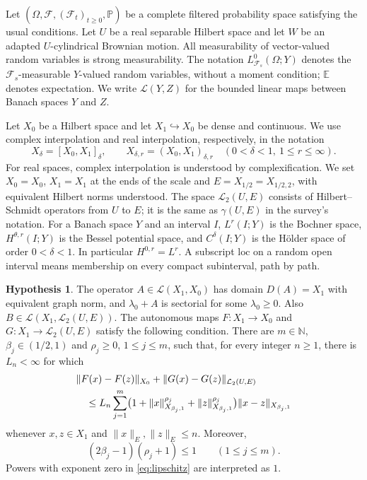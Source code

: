 \documentclass[11pt]{amsart}
\theoremstyle{definition}
\newtheorem{hypothesis}[theorem]{Hypothesis}
\theoremstyle{remark}
\newcommand{\E}{\mathbb E}
\newcommand{\Prob}{\mathbb P}
\newcommand{\N}{\mathbb N}
\newcommand{\loc}{\mathrm{loc}}
\newcommand{\HS}{\mathcal L_2(U,E)}
\newcommand{\norm}[2][]{\lVert #2\rVert_{#1}}
\numberwithin{equation}{section}
\begin{document}
Let $(\Omega,\mathcal F,(\mathcal F_t)_{t\ge0},\Prob)$ be a complete
filtered probability space satisfying the usual conditions. Let $U$ be a
real separable Hilbert space and let $W$ be an adapted $U$-cylindrical
Brownian motion. All measurability of vector-valued random variables is
strong measurability. The notation $L^0_{\mathcal F_s}(\Omega;Y)$ denotes
the $\mathcal F_s$-measurable $Y$-valued random variables, without a moment
condition; $\E$ denotes expectation. We write $\mathcal L(Y,Z)$ for the
bounded linear maps between Banach spaces $Y$ and $Z$.

Let $X_0$ be a Hilbert space and let $X_1\hookrightarrow X_0$ be dense and
continuous. We use complex interpolation and real interpolation, respectively,
in the notation
\[
 X_\delta=[X_0,X_1]_\delta,\qquad
 X_{\delta,r}=(X_0,X_1)_{\delta,r}
 \quad(0<\delta<1,\ 1\le r\le\infty).
\]
For real spaces, complex interpolation is understood by complexification.
We set $X_{0}=X_0$, $X_{1}=X_1$ at the ends of the scale and
$E=X_{1/2}=X_{1/2,2}$, with equivalent Hilbert norms understood.
The space $\HS$ consists of Hilbert--Schmidt operators from $U$ to $E$;
it is the same as $\gamma(U,E)$ in the survey's notation.
For a Banach space $Y$ and an interval $I$, $L^r(I;Y)$ is the Bochner
space, $H^{\theta,r}(I;Y)$ is the Bessel potential space, and
$C^\delta(I;Y)$ is the H\"older space of order $0<\delta<1$.
In particular $H^{0,r}=L^r$. A subscript $\loc$ on a random open interval
means membership on every compact subinterval, path by path.

\begin{hypothesis}\label{hyp:nonlinear}
The operator $A\in\mathcal L(X_1,X_0)$ has domain $D(A)=X_1$ with
equivalent graph norm, and $\lambda_0+A$ is sectorial for some
$\lambda_0\ge0$. Also $B\in\mathcal L(X_1,\HS)$.
The autonomous maps $F:X_1\to X_0$ and $G:X_1\to\HS$ satisfy the
following condition. There are $m\in\N$, $\beta_j\in(1/2,1)$ and
$\rho_j\ge0$, $1\le j\le m$, such that, for every integer $n\ge1$,
there is $L_n<\infty$ for which
\begin{align}\label{eq:lipschitz}
 &\norm[X_0]{F(x)-F(z)}+\norm[\HS]{G(x)-G(z)}\\
 &\quad\le L_n\sum_{j=1}^m
 \bigl(1+\norm[X_{\beta_j,1}]{x}^{\rho_j}
          +\norm[X_{\beta_j,1}]{z}^{\rho_j}\bigr)
       \norm[X_{\beta_j,1}]{x-z}\notag
\end{align}
whenever $x,z\in X_1$ and $\norm[E]{x},\norm[E]{z}\le n$. Moreover,
\begin{equation}\label{eq:critical}
 (2\beta_j-1)(\rho_j+1)\le1\qquad(1\le j\le m).
\end{equation}
Powers with exponent zero in \eqref{eq:lipschitz} are interpreted as $1$.
\end{hypothesis}
\end{document}

